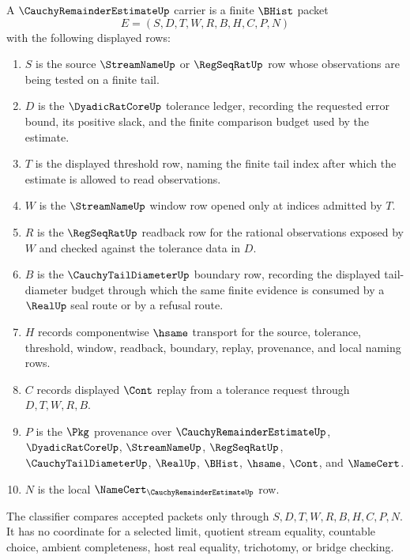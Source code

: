 \begin{definition}
\label{def:cauchy-remainder-estimate-carrier}
A $\CauchyRemainderEstimateUp$ carrier is a finite $\BHist$ packet
$$
E=(S,D,T,W,R,B,H,C,P,N)
$$
with the following displayed rows:
\begin{enumerate}
\item $S$ is the source $\StreamNameUp$ or $\RegSeqRatUp$ row whose observations are being tested on a finite tail.
\item $D$ is the $\DyadicRatCoreUp$ tolerance ledger, recording the requested error bound, its positive slack, and the finite comparison budget used by the estimate.
\item $T$ is the displayed threshold row, naming the finite tail index after which the estimate is allowed to read observations.
\item $W$ is the $\StreamNameUp$ window row opened only at indices admitted by $T$.
\item $R$ is the $\RegSeqRatUp$ readback row for the rational observations exposed by $W$ and checked against the tolerance data in $D$.
\item $B$ is the $\CauchyTailDiameterUp$ boundary row, recording the displayed tail-diameter budget through which the same finite evidence is consumed by a $\RealUp$ seal route or by a refusal route.
\item $H$ records componentwise $\hsame$ transport for the source, tolerance, threshold, window, readback, boundary, replay, provenance, and local naming rows.
\item $C$ records displayed $\Cont$ replay from a tolerance request through $D,T,W,R,B$.
\item $P$ is the $\Pkg$ provenance over $\CauchyRemainderEstimateUp$, $\DyadicRatCoreUp$, $\StreamNameUp$, $\RegSeqRatUp$, $\CauchyTailDiameterUp$, $\RealUp$, $\BHist$, $\hsame$, $\Cont$, and $\NameCert$.
\item $N$ is the local $\NameCert_{\CauchyRemainderEstimateUp}$ row.
\end{enumerate}
The classifier compares accepted packets only through $S,D,T,W,R,B,H,C,P,N$. It has no coordinate for a selected limit, quotient stream equality, countable choice, ambient completeness, host real equality, trichotomy, or bridge checking.
\end{definition}

